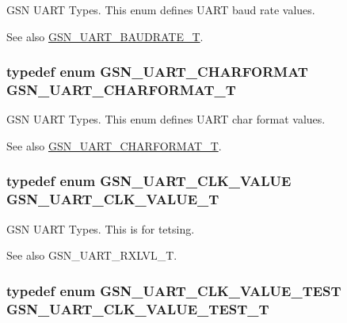 GSN UART Types. This enum defines UART baud rate values. 

\begin{DoxySeeAlso}{See also}
\hyperlink{a00656_ga867d009d402b5b0186abe5307715b9fc}{GSN\_\-UART\_\-BAUDRATE\_\-T}. 
\end{DoxySeeAlso}
\hypertarget{a00656_gaf208b91b10fde1d137e4ec8a7dde641b}{
\subsubsection[{GSN\_\-UART\_\-CHARFORMAT\_\-T}]{\setlength{\rightskip}{0pt plus 5cm}typedef enum {\bf GSN\_\-UART\_\-CHARFORMAT}  {\bf GSN\_\-UART\_\-CHARFORMAT\_\-T}}}
\label{a00656_gaf208b91b10fde1d137e4ec8a7dde641b}


GSN UART Types. This enum defines UART char format values. 

\begin{DoxySeeAlso}{See also}
\hyperlink{a00656_gaf208b91b10fde1d137e4ec8a7dde641b}{GSN\_\-UART\_\-CHARFORMAT\_\-T}. 
\end{DoxySeeAlso}
\hypertarget{a00656_ga20d80c69e5cf0a5f5460e7fe0cfb2787}{
\subsubsection[{GSN\_\-UART\_\-CLK\_\-VALUE\_\-T}]{\setlength{\rightskip}{0pt plus 5cm}typedef enum {\bf GSN\_\-UART\_\-CLK\_\-VALUE} {\bf GSN\_\-UART\_\-CLK\_\-VALUE\_\-T}}}
\label{a00656_ga20d80c69e5cf0a5f5460e7fe0cfb2787}


GSN UART Types. This is for tetsing. 

\begin{DoxySeeAlso}{See also}
GSN\_\-UART\_\-RXLVL\_\-T. 
\end{DoxySeeAlso}
\hypertarget{a00656_ga52bf28199735274775228339e8d05012}{
\subsubsection[{GSN\_\-UART\_\-CLK\_\-VALUE\_\-TEST\_\-T}]{\setlength{\rightskip}{0pt plus 5cm}typedef enum {\bf GSN\_\-UART\_\-CLK\_\-VALUE\_\-TEST} {\bf GSN\_\-UART\_\-CLK\_\-VALUE\_\-TEST\_\-T}}}
\label{a00656_ga52bf28199735274775228339e8d05012}


